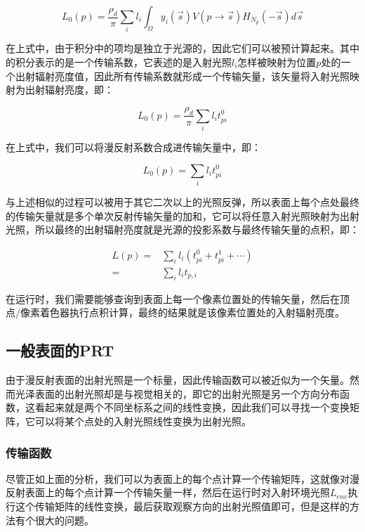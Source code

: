 \begin{equation}
	L_0(p)=\frac{\rho_d}{\pi}\sum_i l_i\int_{\Omega}y_i(\vec{s})V(p\to\vec{s})H_{N_p}(-\vec{s})d\vec{s}
\end{equation}

在上式中，由于积分中的项均是独立于光源的，因此它们可以被预计算起来。其中的积分表示的是一个传输系数，它表述的是入射光照$l_i$怎样被映射为位置$p$处的一个出射辐射亮度值，因此所有传输系数就形成一个传输矢量，该矢量将入射光照映射为出射辐射亮度，即：

\begin{equation}
	L_0(p)=\frac{\rho_d}{\pi}\sum_i l_i t^{0}_{pi}
\end{equation}

\noindent 在上式中，我们可以将漫反射系数合成进传输矢量中，即：

\begin{equation}
	L_0(p)=\sum_i l_i t^{0}_{pi}
\end{equation} 

与上述相似的过程可以被用于其它二次以上的光照反弹，所以表面上每个点处最终的传输矢量就是多个单次反射传输矢量的加和，它可以将任意入射光照映射为出射光照，所以最终的出射辐射亮度就是光源的投影系数与最终传输矢量的点积，即：

\begin{equation}
	\begin{aligned}
		L(p)=&\sum_i l_i(t^{0}_{pi}+t^{1}_{pi}+\cdots)\\
		    =&\sum_i l_i t_{p,i}
	\end{aligned}
\end{equation}

在运行时，我们需要能够查询到表面上每一个像素位置处的传输矢量，然后在顶点/像素着色器执行点积计算，最终的结果就是该像素位置处的入射辐射亮度。




\subsection{一般表面的PRT}
由于漫反射表面的出射光照是一个标量，因此传输函数可以被近似为一个矢量。然而光泽表面的出射光照却是与视觉相关的，即它的出射光照是另一个方向分布函数，这看起来就是两个不同坐标系之间的线性变换，因此我们可以寻找一个变换矩阵，它可以将某个点处的入射光照线性变换为出射光照。



\subsubsection{传输函数}
尽管正如上面的分析，我们可以为表面上的每个点计算一个传输矩阵，这就像对漫反射表面上的每个点计算一个传输矢量一样，然后在运行时对入射环境光照$L_{env}$执行这个传输矩阵的线性变换，最后获取观察方向的出射光照值即可，但是这样的方法有个很大的问题。

